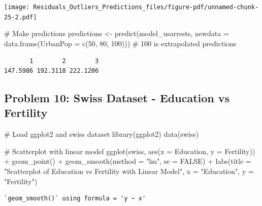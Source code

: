 \documentclass[
  letterpaper,
  DIV=11,
  numbers=noendperiod]{scrreprt}
\newenvironment{Shaded}{\begin{snugshade}}{\end{snugshade}}
\newcommand{\AttributeTok}[1]{\textcolor[rgb]{0.40,0.45,0.13}{#1}}
\newcommand{\CommentTok}[1]{\textcolor[rgb]{0.37,0.37,0.37}{#1}}
\newcommand{\ConstantTok}[1]{\textcolor[rgb]{0.56,0.35,0.01}{#1}}
\newcommand{\DecValTok}[1]{\textcolor[rgb]{0.68,0.00,0.00}{#1}}
\newcommand{\FunctionTok}[1]{\textcolor[rgb]{0.28,0.35,0.67}{#1}}
\newcommand{\NormalTok}[1]{\textcolor[rgb]{0.00,0.23,0.31}{#1}}
\newcommand{\OtherTok}[1]{\textcolor[rgb]{0.00,0.23,0.31}{#1}}
\newcommand{\SpecialCharTok}[1]{\textcolor[rgb]{0.37,0.37,0.37}{#1}}
\newcommand{\StringTok}[1]{\textcolor[rgb]{0.13,0.47,0.30}{#1}}
\begin{document}
\texttt{[image: Residuals\_Outliers\_Predictions\_files/figure-pdf/unnamed-chunk-25-2.pdf]}

\begin{Shaded}
\begin{Highlighting}[]
\CommentTok{\# Make predictions}
\NormalTok{predictions }\OtherTok{\textless{}{-}} \FunctionTok{predict}\NormalTok{(model\_usarrests, }\AttributeTok{newdata =} \FunctionTok{data.frame}\NormalTok{(}\AttributeTok{UrbanPop =} \FunctionTok{c}\NormalTok{(}\DecValTok{50}\NormalTok{, }\DecValTok{80}\NormalTok{, }\DecValTok{100}\NormalTok{))) }\CommentTok{\# 100 is extrapolated}
\NormalTok{predictions}
\end{Highlighting}
\end{Shaded}

\begin{verbatim}
       1        2        3 
147.5986 192.3118 222.1206 
\end{verbatim}

\subsection*{Problem 10: Swiss Dataset - Education vs
Fertility}\label{problem-10-swiss-dataset---education-vs-fertility-2}

\begin{Shaded}
\begin{Highlighting}[]
\CommentTok{\# Load ggplot2 and swiss dataset}
\FunctionTok{library}\NormalTok{(ggplot2)}
\FunctionTok{data}\NormalTok{(swiss)}

\CommentTok{\# Scatterplot with linear model}
\FunctionTok{ggplot}\NormalTok{(swiss, }\FunctionTok{aes}\NormalTok{(}\AttributeTok{x =}\NormalTok{ Education, }\AttributeTok{y =}\NormalTok{ Fertility)) }\SpecialCharTok{+}
  \FunctionTok{geom\_point}\NormalTok{() }\SpecialCharTok{+}
  \FunctionTok{geom\_smooth}\NormalTok{(}\AttributeTok{method =} \StringTok{"lm"}\NormalTok{, }\AttributeTok{se =} \ConstantTok{FALSE}\NormalTok{) }\SpecialCharTok{+}
  \FunctionTok{labs}\NormalTok{(}\AttributeTok{title =} \StringTok{"Scatterplot of Education vs Fertility with Linear Model"}\NormalTok{, }\AttributeTok{x =} \StringTok{"Education"}\NormalTok{, }\AttributeTok{y =} \StringTok{"Fertility"}\NormalTok{)}
\end{Highlighting}
\end{Shaded}

\begin{verbatim}
`geom_smooth()` using formula = 'y ~ x'
\end{verbatim}
\end{document}
